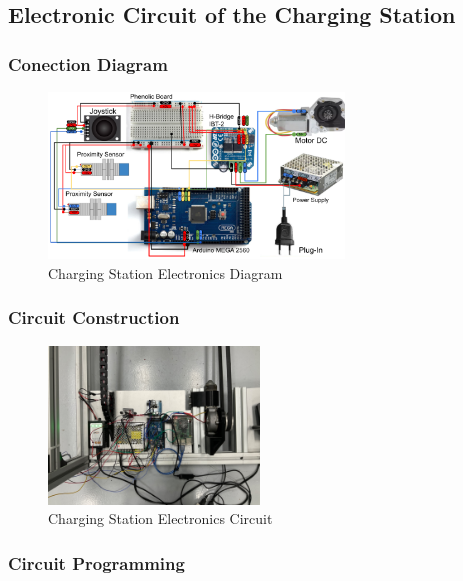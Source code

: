 
\subsection{Electronic Circuit of the Charging Station}

    \subsubsection{Conection Diagram}
    
    \begin{figure}[H]
        \centering
        \includegraphics[width=0.7\textwidth]{pictures/circuito charging st (1).png}
        \caption{Charging Station Electronics Diagram}
        \label{fig:station_electronics_diagram}
    \end{figure}
    
    \subsubsection{Circuit Construction}
    \begin{figure}[H]
        \centering
        \includegraphics[width=0.5\textwidth]{pictures/station_electronics_circuit.jpeg}
        \caption{Charging Station Electronics Circuit}
        \label{fig:station_electronics_circuit}
    \end{figure}
    
    \subsubsection{Circuit Programming}
    
